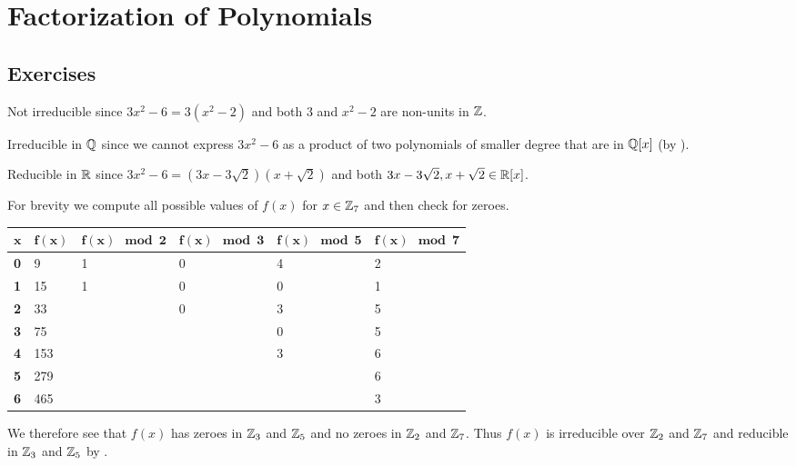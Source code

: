 \section{Factorization of Polynomials}
\subsection*{Exercises}
\begin{questions}
    \item \begin{partquestions}{\alph*}
        \item Not irreducible since $3x^2 - 6 = 3(x^2-2)$ and both 3 and $x^2-2$ are non-units in $\mathbb{Z}$.
        \item Irreducible in $\mathbb{Q}$ since we cannot express $3x^2-6$ as a product of two polynomials of smaller degree that are in $\mathbb{Q}[x]$ (by ).
        \item Reducible in $\mathbb{R}$ since $3x^2 - 6 = (3x-3\sqrt2)(x+\sqrt2)$ and both $3x-3\sqrt2, x+\sqrt2 \in \mathbb{R}[x]$.
    \end{partquestions}

    \item For brevity we compute all possible values of $f(x)$ for $x \in \mathbb{Z}_7$ and then check for zeroes.
    \begin{table}[H]
        \centering
        \fontsize{9pt}{10pt}\selectfont
        \begin{tabular}{|l|l|l|l|l|l|}
            \hline
            $\boldsymbol{x}$ & $\boldsymbol{f(x)}$ & $\boldsymbol{f(x) \mod2}$ & $\boldsymbol{f(x) \mod3}$ & $\boldsymbol{f(x) \mod5}$ & $\boldsymbol{f(x) \mod7}$ \\ \hline
            \textbf{0} & 9 & 1 & 0 & 4 & 2 \\ \hline
            \textbf{1} & 15 & 1 & 0 & 0 & 1 \\ \hline
            \textbf{2} & 33 &  & 0 & 3 & 5 \\ \hline
            \textbf{3} & 75 &  &  & 0 & 5 \\ \hline
            \textbf{4} & 153 &  &  & 3 & 6 \\ \hline
            \textbf{5} & 279 &  &  &  & 6 \\ \hline
            \textbf{6} & 465 &  &  &  & 3 \\ \hline
        \end{tabular}
    \end{table}
    We therefore see that $f(x)$ has zeroes in $\mathbb{Z}_3$ and $\mathbb{Z}_5$ and no zeroes in $\mathbb{Z}_2$ and $\mathbb{Z}_7$. Thus $f(x)$ is irreducible over $\mathbb{Z}_2$ and $\mathbb{Z}_7$ and reducible in $\mathbb{Z}_3$ and $\mathbb{Z}_5$ by .


\end{questions}
